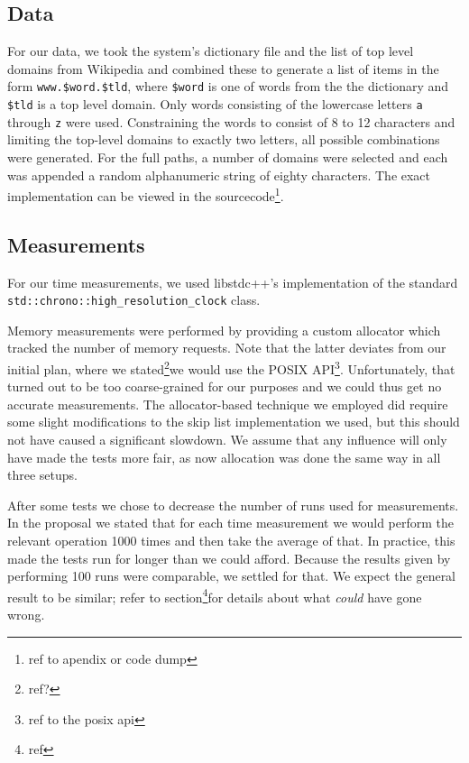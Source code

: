 \documentclass[12pt,a4paper]{article}
\begin{document}
    \subsection*{Data}
    For our data, we took the system's dictionary file and the list of top level domains from Wikipedia
    and combined these to generate a list of items in the form \texttt{www.\$word.\$tld}, where
    \texttt{\$word} is one of words from the the dictionary and \texttt{\$tld} is a top level domain.  Only
    words consisting of the lowercase letters \texttt{a} through \texttt{z} were used.  Constraining the
    words to consist of 8 to 12 characters and limiting the top-level domains to exactly two letters, 
    all possible combinations were generated.  For the full paths, a number of domains were selected
    and each was appended a random alphanumeric string of eighty characters.  The exact implementation
    can be viewed in the sourcecode\footnote{ref to apendix or code dump}.

    \subsection*{Measurements}
    For our time measurements, we used libstdc++'s implementation of the standard
    \texttt{std::chrono::high\_resolution\_clock} class.

    Memory measurements were performed by providing a custom allocator which tracked the number of memory
    requests.  Note that the latter deviates from our initial plan, where we stated\footnote{ref?}we would
    use the POSIX API\footnote{ref to the posix api}.  Unfortunately, that turned out to be too
    coarse-grained for our purposes and we could thus get no accurate measurements.  The
    allocator-based technique we employed did require some slight modifications to the skip list
    implementation we used, but this should not have caused a significant slowdown. We assume that any 
    influence will only have made the tests more fair, as now allocation was done the same way in all 
    three setups.

    After some tests we chose to decrease the number of runs used for measurements.  In the
    proposal we stated that for each time measurement we would perform the relevant operation 1000
    times and then take the average of that.  In practice, this made the tests run for longer than
    we could afford. Because the results given by performing 100 runs were comparable, we settled for that.  
    We expect the general result to be similar; refer to section\footnote{ref}for details
    about what \emph{could} have gone wrong.
\end{document}
